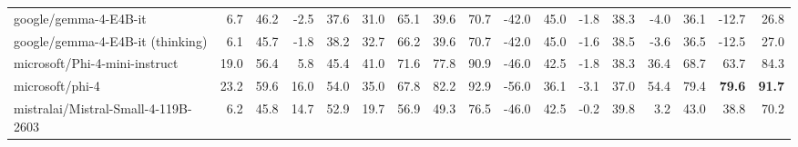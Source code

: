 \documentclass{article}
\begin{document}
\begin{table}[htbp]
\begin{threeparttable}
\begin{adjustbox}{max width=\textwidth}
\begin{tabular}{lrrrrrrrrrrrrrrrr}
google/gemma-4-E4B-it & \cellcolor[HTML]{F8C9B5}6.7 & \cellcolor[HTML]{F9CFBC}46.2 & \cellcolor[HTML]{F6BA9F}-2.5 & \cellcolor[HTML]{F7BFA6}37.6 & \cellcolor[HTML]{FAD7C7}31.0 & \cellcolor[HTML]{FBE0D5}65.1 & \cellcolor[HTML]{F9D3C2}39.6 & \cellcolor[HTML]{FADED1}70.7 & \cellcolor[HTML]{FFFFFF}-42.0 & \cellcolor[HTML]{F9FBFD}45.0 & \cellcolor[HTML]{F8FBFC}-1.8 & \cellcolor[HTML]{F5FAFC}38.3 & \cellcolor[HTML]{F4A582}-4.0 & \cellcolor[HTML]{F4A582}36.1 & \cellcolor[HTML]{F4A582}-12.7 & \cellcolor[HTML]{F4A582}26.8 \\
google/gemma-4-E4B-it (thinking) & \cellcolor[HTML]{F8C6B0}6.1 & \cellcolor[HTML]{F8CBB7}45.7 & \cellcolor[HTML]{F6BDA3}-1.8 & \cellcolor[HTML]{F7C2AB}38.2 & \cellcolor[HTML]{FADCCF}32.7 & \cellcolor[HTML]{FCE6DD}66.2 & \cellcolor[HTML]{F9D3C2}39.6 & \cellcolor[HTML]{FADED1}70.7 & \cellcolor[HTML]{FFFFFF}-42.0 & \cellcolor[HTML]{F9FBFD}45.0 & \cellcolor[HTML]{F1F7FA}-1.6 & \cellcolor[HTML]{EFF6FA}38.5 & \cellcolor[HTML]{F4A583}-3.6 & \cellcolor[HTML]{F4A683}36.5 & \cellcolor[HTML]{F4A582}-12.5 & \cellcolor[HTML]{F4A582}27.0 \\
microsoft/Phi-4-mini-instruct & \cellcolor[HTML]{E9F3F8}19.0 & \cellcolor[HTML]{E0EEF5}56.4 & \cellcolor[HTML]{FADDCF}5.8 & \cellcolor[HTML]{FCE6DD}45.4 & \cellcolor[HTML]{FEF8F5}41.0 & \cellcolor[HTML]{F8FBFD}71.6 & \cellcolor[HTML]{B5D7E8}77.8 & \cellcolor[HTML]{ADD3E6}90.9 & \cellcolor[HTML]{FBE5DB}-46.0 & \cellcolor[HTML]{FCE9E1}42.5 & \cellcolor[HTML]{F8FBFC}-1.8 & \cellcolor[HTML]{F5FAFC}38.3 & \cellcolor[HTML]{FDF2ED}36.4 & \cellcolor[HTML]{F5F9FC}68.7 & \cellcolor[HTML]{B7D8E9}63.7 & \cellcolor[HTML]{ABD2E5}84.3 \\
microsoft/phi-4 & \cellcolor[HTML]{CCE4EF}23.2 & \cellcolor[HTML]{C5E0ED}59.6 & \cellcolor[HTML]{F4F9FB}16.0 & \cellcolor[HTML]{E8F2F8}54.0 & \cellcolor[HTML]{FBE4D9}35.0 & \cellcolor[HTML]{FDEFE9}67.8 & \cellcolor[HTML]{A6CFE4}82.2 & \cellcolor[HTML]{A1CDE2}92.9 & \cellcolor[HTML]{F4A582}-56.0 & \cellcolor[HTML]{F4A582}36.1 & \cellcolor[HTML]{FBE2D7}-3.1 & \cellcolor[HTML]{FBE4DA}37.0 & \cellcolor[HTML]{E3F0F6}54.4 & \cellcolor[HTML]{CEE5F0}79.4 & \cellcolor[HTML]{92C5DE}\textbf{79.6} & \cellcolor[HTML]{92C5DE}\textbf{91.7} \\
mistralai/Mistral-Small-4-119B-2603 & \cellcolor[HTML]{F8C7B1}6.2 & \cellcolor[HTML]{F8CCB9}45.8 & \cellcolor[HTML]{FBFDFD}14.7 & \cellcolor[HTML]{EEF6FA}52.9 & \cellcolor[HTML]{F5B192}19.7 & \cellcolor[HTML]{F5B497}56.9 & \cellcolor[HTML]{FCEDE7}49.3 & \cellcolor[HTML]{FEFBF9}76.5 & \cellcolor[HTML]{FBE5DB}-46.0 & \cellcolor[HTML]{FCE9E1}42.5 & \cellcolor[HTML]{C8E2EE}-0.2 & \cellcolor[HTML]{C6E1ED}39.8 & \cellcolor[HTML]{F5B295}3.2 & \cellcolor[HTML]{F6B99F}43.0 & \cellcolor[HTML]{F2F8FB}38.8 & \cellcolor[HTML]{DAEBF3}70.2 \\

\end{tabular}
\end{adjustbox}
\end{threeparttable}
\end{table}
\end{document}
